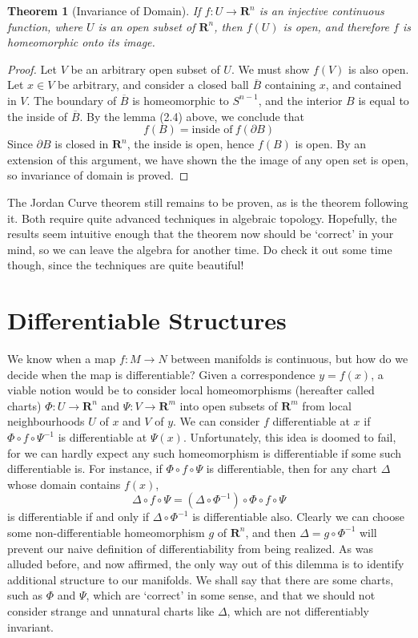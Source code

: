 \documentclass[12pt]{report}
\theoremstyle{plain}
\newtheorem{theorem}{Theorem}[chapter]
\theoremstyle{definition}
\begin{document}
\begin{theorem}[Invariance of Domain]
    If $f:U \to \mathbf{R}^n$ is an injective continuous function, where $U$ is an open subset of $\mathbf{R}^n$, then $f(U)$ is open, and therefore $f$ is homeomorphic onto its image.
\end{theorem}
\begin{proof}
    Let $V$ be an arbitrary open subset of $U$. We must show $f(V)$ is also open. Let $x \in V$ be arbitrary, and consider a closed ball $\overline{B}$ containing $x$, and contained in $V$. The boundary of $\overline{B}$ is homeomorphic to $S^{n-1}$, and the interior $B$ is equal to the inside of $\overline{B}$. By the lemma (2.4) above, we conclude that
    \[ f(B) = \text{inside of}\ f(\partial B) \]
    Since $\partial B$ is closed in $\mathbf{R}^n$, the inside is open, hence $f(B)$ is open. By an extension of this argument, we have shown the the image of any open set is open, so invariance of domain is proved.
\end{proof}

The Jordan Curve theorem still remains to be proven, as is the theorem following it. Both require quite advanced techniques in algebraic topology. Hopefully, the results seem intuitive enough that the theorem now should be `correct' in your mind, so we can leave the algebra for another time. Do check it out some time though, since the techniques are quite beautiful!







\chapter{Differentiable Structures}

We know when a map $f:M \to N$ between manifolds is continuous, but how do we decide when the map is differentiable? Given a correspondence $y = f(x)$, a viable notion would be to consider local homeomorphisms (hereafter called charts) $\Phi:U \to \mathbf{R}^n$ and $\Psi:V \to \mathbf{R}^m$ into open subsets of $\mathbf{R}^m$ from local neighbourhoods $U$ of $x$ and $V$ of $y$. We can consider $f$ differentiable at $x$ if $\Phi \circ f \circ \Psi^{-1}$ is differentiable at $\Psi(x)$. Unfortunately, this idea is doomed to fail, for we can hardly expect any such homeomorphism is differentiable if some such differentiable is. For instance, if $\Phi \circ f \circ \Psi$ is differentiable, then for any chart $\Delta$ whose domain contains $f(x)$,
%
\[ \Delta \circ f \circ \Psi = (\Delta \circ \Phi^{-1}) \circ \Phi \circ f \circ \Psi \]
%
is differentiable if and only if $\Delta \circ \Phi^{-1}$ is differentiable also. Clearly we can choose some non-differentiable homeomorphism $g$ of $\mathbf{R}^n$, and then $\Delta = g \circ \Phi^{-1}$ will prevent our naive definition of differentiability from being realized. As was alluded before, and now affirmed, the only way out of this dilemma is to identify additional structure to our manifolds. We shall say that there are some charts, such as $\Phi$ and $\Psi$, which are `correct' in some sense, and that we should not consider strange and unnatural charts like $\Delta$, which are not differentiably invariant.
\end{document}
